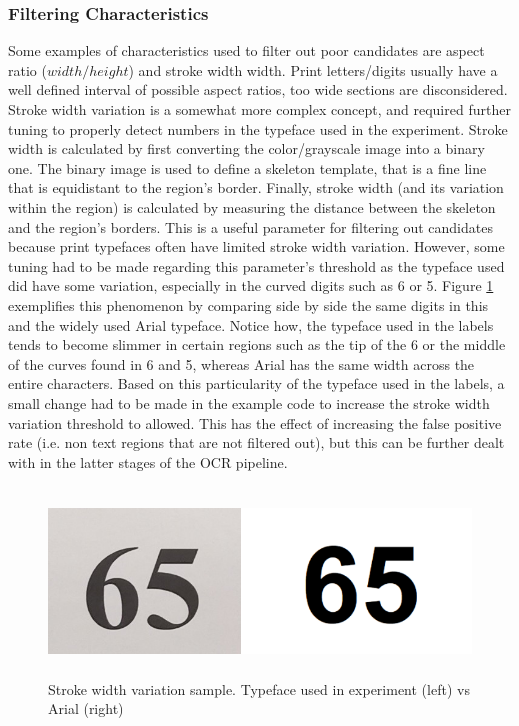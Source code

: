 \documentclass[11pt]{article}
\begin{document}
    \subsubsection{Filtering Characteristics}
        Some examples of characteristics used to filter out poor candidates are aspect ratio ($width / height$) and stroke width width. Print letters/digits usually have a well defined interval of possible aspect ratios, too wide sections are disconsidered. Stroke width variation is a somewhat more complex concept, and required further tuning to properly detect numbers in the typeface used in the experiment. Stroke width is calculated by first converting the color/grayscale image into a binary one. The binary image is used to define a skeleton template, that is a fine line that is equidistant to the region's border. Finally, stroke width (and its variation within the region) is calculated by measuring the distance between the skeleton and the region's borders. This is a useful parameter for filtering out candidates because print typefaces often have limited stroke width variation. However, some tuning had to be made regarding this parameter's threshold as the typeface used did have some variation, especially in the curved digits such as 6 or 5. Figure \ref{fig:ocr:stroke} exemplifies this phenomenon by comparing side by side the same digits in this and the widely used Arial typeface. Notice how, the typeface used in the labels tends to become slimmer in certain regions such as the tip of the 6 or the middle of the curves found in 6 and 5, whereas Arial has the same width across the entire characters. Based on this particularity of the typeface used in the labels, a small change had to be made in the example code to increase the stroke width variation threshold to allowed. This has the effect of increasing the false positive rate (i.e. non text regions that are not filtered out), but this can be further dealt with in the latter stages of the OCR pipeline.
        \begin{figure}[h]
            \centering
            \includegraphics[height=5cm]{./Images/ocr/stroke.png}
            \caption{Stroke width variation sample. Typeface used in experiment (left) vs Arial (right)}
            \label{fig:ocr:stroke}
        \end{figure}
\end{document}
